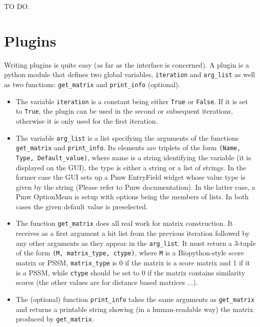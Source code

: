 \documentclass[10pt,letter]{article}
\begin{document}
TO DO.

\section{Plugins}

Writing plugins is quite easy (as far as the interface is concerned). A plugin is a python module that defines two global variables, \texttt{iteration} and \texttt{arg\_list} as well as two functions: \texttt{get\_matrix} and \texttt{print\_info} (optional).

\begin{itemize}
\item The variable \texttt{iteration} is a constant being either \texttt{True} or \texttt{False}. If it is set to \texttt{True}, the plugin can be used in the second or subsequent iterations, otherwise it is only used for the first iteration.

\item The variable \texttt{arg\_list} is a list specifying the arguments of the functions \texttt{get\_matrix} and \texttt{print\_info}. Its elements are triplets of the form \texttt{(Name, Type, Default\_value)}, where name is a string identifying the variable (it is displayed on the GUI), the type is either a string or a list of strings. In the former case the GUI sets up a Pmw EntryField widget whose value type is given by the string (Please refer to Pmw documentation). In the latter case, a Pmw OptionMenu is setup with options being the members of lists. In both cases the given default value is preselected.

\item The function \texttt{get\_matrix} does all real work for matrix construction. It receives as a first argument a hit list from the previous iteration followed by any other arguments as they appear in the \texttt{arg\_list}. It must return a 3-tuple of the form \texttt{(M, matrix\_type, ctype)}, where \texttt{M} is a Biopython-style score matrix or PSSM, \texttt{matrix\_type} is 0 if the matrix is a score matrix and 1 if it is a PSSM, while \texttt{ctype} should be set to 0 if the matrix contains similarity scores (the other values are for distance based matrices ...).

\item The (optional) function \texttt{print\_info} takes the same arguments as \texttt{get\_matrix} and returns a printable string showing (in a human-readable way) the matrix produced by \texttt{get\_matrix}.

\end{itemize}
\end{document}
